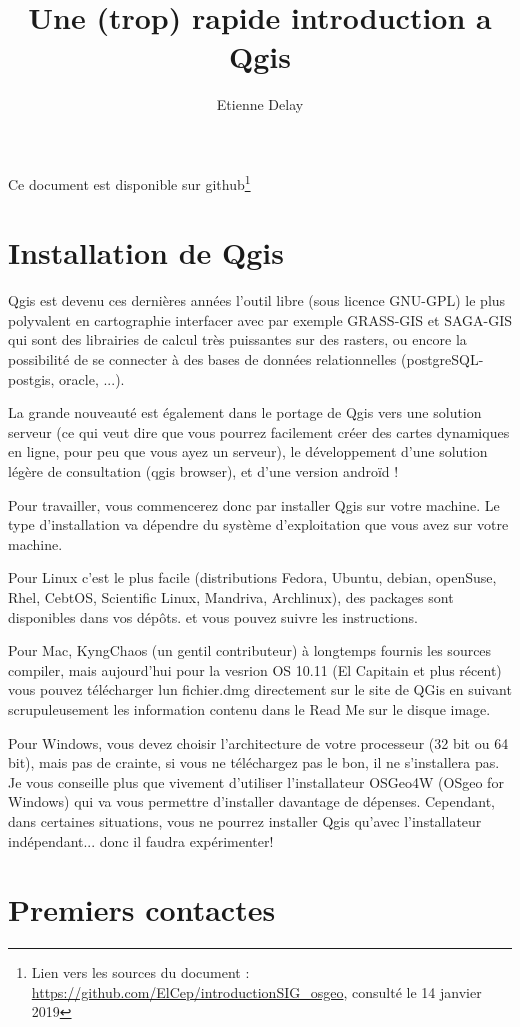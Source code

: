 \documentclass[a4paper, 11pt]{article}
\title{Une (trop) rapide introduction a Qgis}
\author[123]{Etienne Delay}
\affil[1]{1 CIRAD UPR GREEN, F-34398 Montpellier, France}
\affil[2]{GREEN, CIRAD, Univ. Montpellier, Montpellier France}
\affil[3]{Laboratoire GEOLAB UMR 6042 CNRS, Universit\'e de Limoges, FLSH. 39E rue Camille Gu\'erin, 87036 Limoges, France}
\begin{document}
\maketitle
Ce document est disponible sur github\footnote{Lien vers les sources du document : \url{https://github.com/ElCep/introductionSIG_osgeo}, consulté le 14 janvier 2019}
\section{Installation de Qgis}
  Qgis est devenu ces dernières années l'outil libre (sous licence GNU-GPL) le plus polyvalent en cartographie interfacer avec par exemple GRASS-GIS et SAGA-GIS qui sont des librairies de calcul très puissantes sur des rasters, ou encore la possibilité de se connecter à des bases de données relationnelles (postgreSQL-postgis, oracle, ...).

  La grande nouveauté est également dans le portage de Qgis vers une solution serveur (ce qui veut dire que vous pourrez facilement créer des cartes dynamiques en ligne, pour peu que vous ayez un serveur), le développement d'une solution légère de consultation (qgis browser), et d'une version androïd !

  Pour travailler, vous commencerez donc par installer Qgis sur votre machine. Le type d'installation va dépendre du système d'exploitation que vous avez sur votre machine.

  Pour Linux c'est le plus facile (distributions Fedora, Ubuntu, debian, openSuse, Rhel, CebtOS, Scientific Linux, Mandriva, Archlinux), des packages sont disponibles dans vos dépôts. et vous pouvez suivre les instructions.

  Pour Mac, KyngChaos (un gentil contributeur) à longtemps fournis les sources compiler, mais aujourd'hui pour la vesrion OS 10.11 (El Capitain et plus récent) vous pouvez télécharger lun fichier.dmg directement sur le site de QGis en suivant scrupuleusement les information contenu dans le Read Me sur le disque image.

  Pour Windows, vous devez choisir l'architecture de votre processeur (32 bit ou 64 bit), mais pas de crainte, si vous ne téléchargez pas le bon, il ne s'installera pas. Je vous conseille plus que vivement d'utiliser l'installateur OSGeo4W (OSgeo for Windows) qui va vous permettre d'installer davantage de dépenses. Cependant, dans certaines situations, vous ne pourrez installer Qgis qu'avec l'installateur indépendant... donc il faudra expérimenter!

\section{Premiers contactes}
\end{document}
